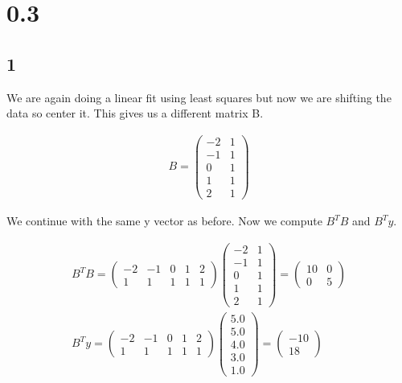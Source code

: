 \documentclass[a4paper]{article}
\begin{document}
\section*{0.3}

\subsection*{1}

We are again doing a linear fit using least squares but now we are shifting the data so center it. This gives us a different matrix B.

\begin{align*}
    B = \begin{pmatrix}
        -2 & 1\\
        -1 & 1\\
        0 & 1\\
        1 & 1\\
        2 & 1
    \end{pmatrix}
\end{align*}

We continue with the same y vector as before. Now we compute $B^TB$ and $B^Ty$.

\begin{align*}
    B^TB = \begin{pmatrix}
        -2 & -1 & 0 & 1 & 2\\
        1 & 1 & 1 & 1 & 1
    \end{pmatrix} \begin{pmatrix}
        -2 & 1\\
        -1 & 1\\
        0 & 1\\
        1 & 1\\
        2 & 1
    \end{pmatrix} = \begin{pmatrix}
        10 & 0\\
        0 & 5
    \end{pmatrix}\\
    B^Ty = \begin{pmatrix}
        -2 & -1 & 0 & 1 & 2\\
        1 & 1 & 1 & 1 & 1
    \end{pmatrix} \begin{pmatrix}
        5.0\\
        5.0\\
        4.0\\
        3.0\\
        1.0
    \end{pmatrix} = \begin{pmatrix}
        -10\\
        18
    \end{pmatrix}
\end{align*}
\end{document}
